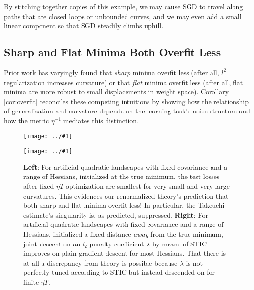 \documentclass{article}
\theoremstyle{plain}
\theoremstyle{definition}
\newcommand{\plotmoo}[3]{
    \texttt{[image: ../\#1]}
}
\begin{document}
        By stitching together copies of this example, we may cause SGD to
        travel along paths that are closed loops or unbounded curves, and we
        may even add a small linear component so that SGD steadily climbs
        uphill.  



    \subsection{Sharp and Flat Minima Both Overfit Less} \label{subsect:overfit}
        Prior work has varyingly found that \emph{sharp} minima overfit less
        (after all, $l^2$ regularization increases curvature) or that
        \emph{flat} minima overfit less (after all, flat minima are more
        robust to small displacements in weight space).  Corollary
        \ref{cor:overfit} reconciles these competing intuitions by showing
        how the relationship of generalization and curvature depends on the
        learning task's noise structure and how the metric $\eta^{-1}$ mediates
        this distinction.
        
        \begin{figure}[h!] 
            \centering
            \plotmoo{plots/tak}{0.48\columnwidth}{4.0cm}
            \plotmoo{plots/tak-reg}{0.48\columnwidth}{4.0cm}
            \caption{
                {\bf Left}: For artificial quadratic landscapes with fixed
                covariance and a range of Hessians, initialized at the true
                minimum, the test losses after fixed-$\eta T$ optimization are
                smallest for very small and very large curvatures.  This
                evidences our renormalized theory's prediction that both sharp
                and flat minima overfit less!  In particular, the Takeuchi
                estimate's singularity is, as predicted, suppressed.
                {\bf Right}: For artificial quadratic landscapes with fixed
                covariance and a range of Hessians, initialized a fixed
                distance \emph{away} from the true minimum, joint descent on 
                an $l_2$ penalty coefficient $\lambda$ by means of STIC
                improves on plain gradient descent for most Hessians.  That
                there is at all a discrepancy from theory is possible because
                $\lambda$ is not perfectly tuned according to STIC but instead
                descended on for finite $\eta T$.
            }
            \label{fig:tak}
        \end{figure}
\end{document}
